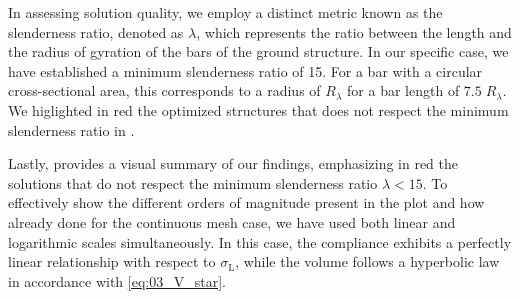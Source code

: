 In assessing solution quality, we employ a distinct metric known as the slenderness ratio, denoted as $\lambda$, which represents the ratio between the length and the radius of gyration of the bars of the ground structure. In our specific case, we have established a minimum slenderness ratio of 15. For a bar with a circular cross-sectional area, this corresponds to a radius of $R_\lambda$ for a bar length of $7.5\;R_\lambda$. We higlighted in red the optimized structures that does not respect the minimum slenderness ratio in . 

Lastly,  provides a visual summary of our findings, emphasizing in red the solutions that do not respect the minimum slenderness ratio $\lambda<15$. To effectively show the different orders of magnitude present in the plot and how already done for the continuous mesh case, we have used both linear and logarithmic scales simultaneously. In this case, the compliance exhibits a perfectly linear relationship with respect to $\sigma_\text{L}$, while the volume follows a hyperbolic law in accordance with \eqref{eq:03_V_star}.

